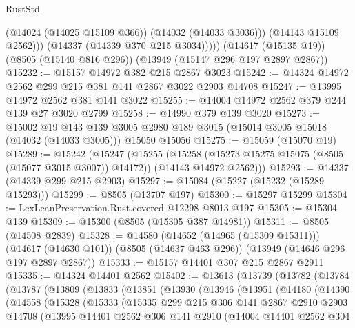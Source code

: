\begin{lexlean}{RustStd}
\begin{coremodule}
                (@14024 (@14025 @15109 @366))
                (@14032 (@14033 @3036)))
              (@14143 @15109 @2562)))
          (@14337 (@14339 @370 @215 @3034)))))
    (@14617 (@15135 @19))
    (@8505 (@15140 @816 @296))
    (@13949 (@15147 @296 @197 @2897 @2867))
@15232 := @15157 @14972 @382 @215 @2867 @3023
@15242 := @14324 @14972 @2562 @299 @215 @381 @141 @2867 @3022 @2903 @14708
@15247 := @13995 @14972 @2562 @381 @141 @3022
@15255 := @14004 @14972 @2562 @379 @244 @139 @27 @3020 @2799
@15258 := @14990 @379 @139 @3020
@15273 := @15002
    @19
    @143
    @139
    @3005
    @2980
    @189
    @3015
    (@15014 @3005 @15018 (@14032 (@14033 @3005)))
    @15050
    @15056
@15275 := @15059 (@15070 @19)
@15289 := @15242
    (@15247
      (@15255
        (@15258 (@15273 @15275 @15075 (@8505 (@15077 @3015 @3007)) @14172))
        (@14143 @14972 @2562)))
@15293 := @14337 (@14339 @299 @215 @2903)
@15297 := @15084 (@15227 (@15232 (@15289 @15293)))
@15299 := @8505 (@13707 @197)
@15300 := @15297 @15299
@15304 := LexLeanPreservation.Rust.covered @12298 @8013 @197
@15305 := @15304 @139
@15309 := @15300 (@8505 (@15305 @387 @14981))
@15311 := @8505 (@14508 @2839)
@15328 := @14580
    (@14652 (@14965 (@15309 @15311)))
    (@14617 (@14630 @101))
    (@8505 (@14637 @463 @296))
    (@13949 (@14646 @296 @197 @2897 @2867))
@15333 := @15157 @14401 @307 @215 @2867 @2911
@15335 := @14324 @14401 @2562
@15402 := @13613
    (@13739
      (@13782
        (@13784
          (@13787
            (@13809
              (@13833
                (@13851
                  (@13930
                    (@13946
                      (@13951
                        (@14180
                          (@14390
                            (@14558
                              (@15328
                                (@15333
                                  (@15335
                                    @299
                                    @215
                                    @306
                                    @141
                                    @2867
                                    @2910
                                    @2903
                                    @14708
                                    (@13995
                                      @14401
                                      @2562
                                      @306
                                      @141
                                      @2910
                                      (@14004
                                        @14401
                                        @2562
                                        @304

\end{coremodule}
\end{lexlean}
